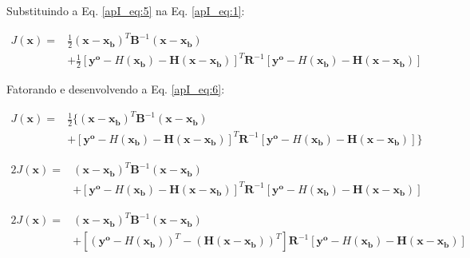 Substituindo a Eq. \ref{apI_eq:5} na Eq. \ref{apI_eq:1}:

\begin{equation}
  \label{apI_eq:6}
  \begin{aligned}
  J(\mathbf{x}) = {} & \frac{1}{2}(\mathbf{x} - \mathbf{x_{b}})^{T}\mathbf{B}^{-1}(\mathbf{x} - \mathbf{x_{b}}) \\
  & + \frac{1}{2}[\mathbf{y^{o}} - \textit{H}(\mathbf{x_{b}}) - \mathbf{H}(\mathbf{x} - \mathbf{x_{b}})]^{T}\mathbf{R}^{-1}[\mathbf{y^{o}} - \textit{H}(\mathbf{x_{b}}) - \mathbf{H}(\mathbf{x} - \mathbf{x_{b}})]
  \end{aligned}
\end{equation}

Fatorando e desenvolvendo a Eq. \ref{apI_eq:6}:

\begin{equation}
  \label{apI_eq:7}
  \begin{aligned}
    J(\mathbf{x}) = {} & \frac{1}{2}\lbrace(\mathbf{x} - \mathbf{x_{b}})^{T}\mathbf{B}^{-1}(\mathbf{x} - \mathbf{x_{b}}) \\
               & + [\mathbf{y^{o}} - \textit{H}(\mathbf{x_{b}}) - \mathbf{H}(\mathbf{x} - \mathbf{x_{b}})]^{T}\mathbf{R}^{-1}[\mathbf{y^{o}} - \textit{H}(\mathbf{x_{b}}) - \mathbf{H}(\mathbf{x} - \mathbf{x_{b}})]\rbrace
  \end{aligned}
\end{equation}

\begin{equation}
  \label{apI_eq:8}
  \begin{aligned}
    2J(\mathbf{x}) = {} & (\mathbf{x} - \mathbf{x_{b}})^{T}\mathbf{B}^{-1}(\mathbf{x} - \mathbf{x_{b}}) \\
    & + [\mathbf{y^{o}} - \textit{H}(\mathbf{x_{b}}) - \mathbf{H}(\mathbf{x} - \mathbf{x_{b}})]^{T}\mathbf{R}^{-1}[\mathbf{y^{o}} - \textit{H}(\mathbf{x_{b}}) - \mathbf{H}(\mathbf{x} - \mathbf{x_{b}})]
  \end{aligned}
\end{equation}

\begin{equation}
  \label{apI_eq:9}
  \begin{aligned}
    2J(\mathbf{x}) = {} & (\mathbf{x} - \mathbf{x_{b}})^{T}\mathbf{B}^{-1}(\mathbf{x} - \mathbf{x_{b}}) \\
    & + [(\mathbf{y^{o}} - \textit{H}(\mathbf{x_{b}}))^{T} - (\mathbf{H}(\mathbf{x} - \mathbf{x_{b}}))^{T}]\mathbf{R}^{-1}[\mathbf{y^{o}} - \textit{H}(\mathbf{x_{b}}) - \mathbf{H}(\mathbf{x} - \mathbf{x_{b}})]
  \end{aligned}
\end{equation}

